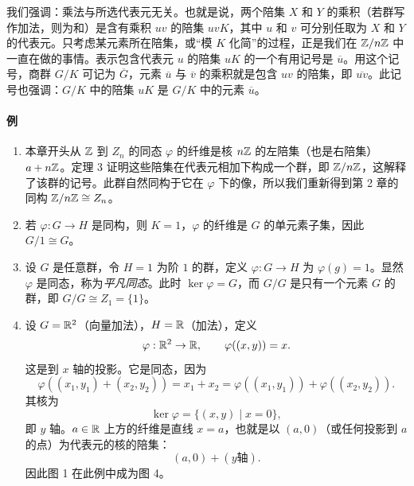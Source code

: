 我们强调：乘法与所选代表元无关。也就是说，两个陪集 $X$ 和 $Y$ 的乘积（若群写作加法，则为和）是含有乘积 $uv$ 的陪集 $uvK$，其中 $u$ 和 $v$ 可分别任取为 $X$ 和 $Y$ 的代表元。只考虑某元素所在陪集，或“模 $K$ 化简”的过程，正是我们在 $\mathbb{Z}/n\mathbb{Z}$ 中一直在做的事情。表示包含代表元 $u$ 的陪集 $uK$ 的一个有用记号是 $\overline u$。用这个记号，商群 $G/K$ 可记为 $\overline G$，元素 $\overline u$ 与 $\overline v$ 的乘积就是包含 $uv$ 的陪集，即 $\overline{uv}$。此记号也强调：$G/K$ 中的陪集 $uK$ 是 $G/K$ 中的元素 $\overline u$。

\paragraph{例}
\begin{enumerate}[label=(\arabic*)]
  \item 本章开头从 $\mathbb{Z}$ 到 $Z_n$ 的同态 $\varphi$ 的纤维是核 $n\mathbb{Z}$ 的左陪集（也是右陪集）$a+n\mathbb{Z}$。定理 3 证明这些陪集在代表元相加下构成一个群，即 $\mathbb{Z}/n\mathbb{Z}$，这解释了该群的记号。此群自然同构于它在 $\varphi$ 下的像，所以我们重新得到第 2 章的同构 $\mathbb{Z}/n\mathbb{Z}\cong Z_n$。
  \item 若 $\varphi:G\to H$ 是同构，则 $K=1$，$\varphi$ 的纤维是 $G$ 的单元素子集，因此 $G/1\cong G$。
  \item 设 $G$ 是任意群，令 $H=1$ 为阶 $1$ 的群，定义 $\varphi:G\to H$ 为 $\varphi(g)=1$。显然 $\varphi$ 是同态，称为\emph{平凡同态}。此时 $\ker\varphi=G$，而 $G/G$ 是只有一个元素 $G$ 的群，即 $G/G\cong Z_1=\{1\}$。
  \item 设 $G=\mathbb{R}^2$（向量加法），$H=\mathbb{R}$（加法），定义
  \[
    \varphi:\mathbb{R}^2\to\mathbb{R},
    \qquad \varphi((x,y))=x.
  \]
  这是到 $x$ 轴的投影。它是同态，因为
  \[
    \varphi((x_1,y_1)+(x_2,y_2))=x_1+x_2
    =\varphi((x_1,y_1))+\varphi((x_2,y_2)).
  \]
  其核为
  \[
    \ker\varphi=\{(x,y)\mid x=0\},
  \]
  即 $y$ 轴。$a\in\mathbb{R}$ 上方的纤维是直线 $x=a$，也就是以 $(a,0)$（或任何投影到 $a$ 的点）为代表元的核的陪集：
  \[
    (a,0)+(y\text{轴}).
  \]
  因此图 1 在此例中成为图 4。

\begin{center}
\end{center}


\end{enumerate}

